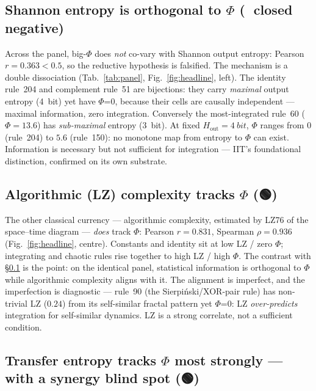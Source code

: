 \documentclass[11pt,a4paper]{article}
\providecommand{\tierGreen}{🟢}
\providecommand{\tierRed}{🔴}
\newcommand{\bigphi}{\ensuremath{\Phi}}
\begin{document}
\subsection{Shannon entropy is orthogonal to \bigphi{} (\tierRed{} closed negative)}
\label{sec:shannon}

Across the panel, big-\bigphi{} does \emph{not} co-vary with Shannon
output entropy: Pearson \(r=0.363<0.5\), so the reductive hypothesis is
falsified. The mechanism is a double dissociation (Tab.~\ref{tab:panel},
Fig.~\ref{fig:headline}, left). The identity rule~204 and complement
rule~51 are bijections: they carry \emph{maximal} output entropy
(\SI{4}{bit}) yet have \bigphi{}=0, because their cells are causally
independent --- maximal information, zero integration. Conversely the
most-integrated rule~60 (\(\bigphi=13.6\)) has \emph{sub-maximal} entropy
(\SI{3}{bit}). At fixed \(H_\mathrm{out}=\SI{4}{bit}\), \bigphi{} ranges
from \(0\) (rule~204) to \(5.6\) (rule~150): no monotone map from entropy
to \bigphi{} can exist. Information is necessary but not sufficient for
integration --- IIT's foundational distinction, confirmed on its own
substrate.

\subsection{Algorithmic (LZ) complexity tracks \bigphi{} (\tierGreen)}
\label{sec:lz}

The other classical currency --- algorithmic complexity, estimated by
LZ76 of the space--time diagram --- \emph{does} track \bigphi{}: Pearson
\(r=0.831\), Spearman \(\rho=0.936\) (Fig.~\ref{fig:headline}, centre).
Constants and identity sit at low LZ / zero \bigphi{}; integrating and
chaotic rules rise together to high LZ / high \bigphi{}. The contrast
with \S\ref{sec:shannon} is the point: on the identical panel, statistical
information is orthogonal to \bigphi{} while algorithmic complexity aligns
with it. The alignment is imperfect, and the imperfection is
diagnostic --- rule~90 (the Sierpi\'nski/XOR-pair rule) has non-trivial LZ
(\(0.24\)) from its self-similar fractal pattern yet \bigphi{}=0: LZ
\emph{over-predicts} integration for self-similar dynamics. LZ is a strong
correlate, not a sufficient condition.

\subsection{Transfer entropy tracks \bigphi{} most strongly --- with a synergy blind spot (\tierGreen)}
\label{sec:te}
\end{document}
